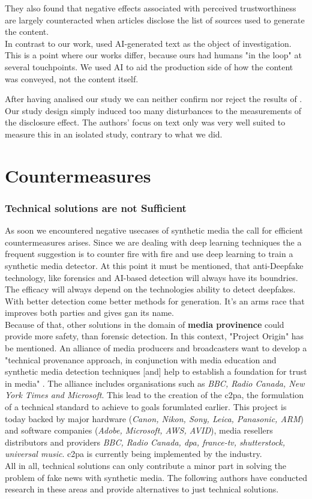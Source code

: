 \documentclass[
  a4paper,  %
  twoside,  %
  bibliography=totoc,
  headsepline,
  cleardoublepage=empty,
  parskip=half,
  draft=false
]{scrbook}
\begin{document}
They also found that negative effects associated with perceived trustworthiness are largely counteracted when articles disclose the list of sources used to generate the content. \\
In contrast to our work, \citeauthor{toffTheyCouldJust2023} used AI-generated text as the object of investigation. This is a point where our works differ, because ours had humans "in the loop" at several touchpoints. We used AI to aid the production side of how the content was conveyed, not the content itself.

After having analised our study we can neither confirm nor reject the results of \citet{toffTheyCouldJust2023}. Our study design simply induced too many disturbances to the measurements of the disclosure effect. The authors' focus on text only was very well suited to measure this in an isolated study, contrary to what we did. 


\section{Countermeasures}
\label{sec:rel-work-counteringdf}
\subsubsection*{Technical solutions are not Sufficient}
As soon we encountered negative usecases of synthetic media the call for efficient countermeasures arises. Since we are dealing with deep learning techniques the a frequent suggestion is to counter fire with fire and use deep learning to train a synthetic media detector. At this point it must be mentioned, that anti-Deepfake technology, like forensics and AI-based detection will always have its boundries. The efficacy will always depend on the technologies ability to detect deepfakes. With better detection come better methods for generation. It's an arms race that improves both parties and gives \gls{gan} its name. \\
Because of that, other solutions in the domain of \textbf{media provinence} could provide more safety, than forensic detection. In this context, "Project Origin" has be mentioned. An alliance of media producers and broadcasters want to develop a "technical provenance approach, in conjunction with media education and synthetic media detection techniques [and] help to establish a foundation for trust in media" \cite{ProjectOrigin}. The alliance includes organisations such as \textit{BBC, Radio Canada, New York Times and Microsoft}. This lead to the creation of the \gls{c2pa}, the formulation of a technical standard to achieve to goals forumlated earlier. This project is today backed by major hardware (\textit{Canon, Nikon, Sony, Leica, Panasonic, ARM}) and software companies (\textit{Adobe, Microsoft, AWS, AVID}), media resellers distributors and providers \textit{BBC, Radio Canada, dpa, france-tv, shutterstock, universal music}. \gls{c2pa} is currently being implemented by the industry. \\
All in all, technical solutions can only contribute a minor part in solving the problem of fake news with synthetic media. The following authors have conducted research in these areas and provide alternatives to just technical solutions. 
\end{document}
